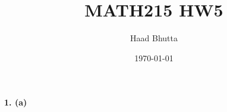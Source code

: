 \documentclass{article}
\title{MATH215 HW5}
\author{Haad Bhutta}
\date{\today}
\begin{document}
\maketitle
\noindent


\textbf{1. (a)}
\end{document}

